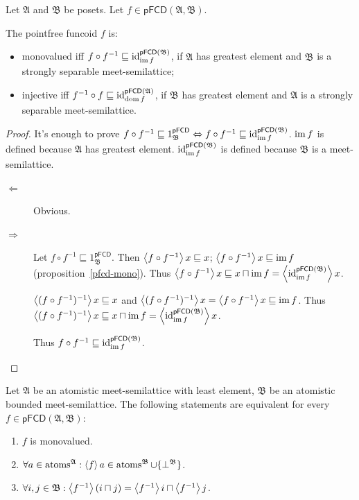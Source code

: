 \begin{prop}
Let $\mathfrak{A}$ and $\mathfrak{B}$ be posets. Let $f\in\mathsf{pFCD}(\mathfrak{A},\mathfrak{B})$.

The pointfree funcoid $f$ is:
\begin{itemize}
\item monovalued iff $f\circ f^{-1}\sqsubseteq{\operatorname{id}}_{\operatorname{im} f}^{\mathsf{pFCD}(\mathfrak{B})}$,
if $\mathfrak{A}$ has greatest element and $\mathfrak{B}$ is a strongly separable meet-semilattice;
\item injective iff $f^{-1}\circ f\sqsubseteq{\operatorname{id}}_{\operatorname{dom} f}^{\mathsf{pFCD}(\mathfrak{A})}$,
if $\mathfrak{B}$ has greatest element and $\mathfrak{A}$ is a strongly separable meet-semilattice. 
\end{itemize}
\end{prop}
\begin{proof}
It's enough to prove $f\circ f^{-1}\sqsubseteq1_{\mathfrak{B}}^{\mathsf{pFCD}}\Leftrightarrow f\circ f^{-1}\sqsubseteq{\operatorname{id}}_{\operatorname{im} f}^{\mathsf{pFCD}(\mathfrak{B})}$.
$\operatorname{im} f$ is defined because $\mathfrak{A}$ has greatest element. ${\operatorname{id}}_{\operatorname{im} f}^{\mathsf{pFCD}(\mathfrak{B})}$ is defined because $\mathfrak{B}$ is a meet-semilattice.
\begin{description}
\item [{$\Leftarrow$}] Obvious.
\item [{$\Rightarrow$}] Let $f\circ f^{-1}\sqsubseteq1_{\mathfrak{B}}^{\mathsf{pFCD}}$.
Then $\left\langle f\circ f^{-1}\right\rangle x\sqsubseteq x$; $\left\langle f\circ f^{-1}\right\rangle x\sqsubseteq\operatorname{im} f$ (proposition~\ref{pfcd-mono}).
Thus $\left\langle f\circ f^{-1}\right\rangle x\sqsubseteq x\sqcap\operatorname{im} f=\left\langle {\operatorname{id}}_{\operatorname{im} f}^{\mathsf{pFCD}(\mathfrak{B})}\right\rangle x$.


$\left\langle (f\circ f^{-1})^{-1}\right\rangle x\sqsubseteq x$ and $\left\langle (f\circ f^{-1})^{-1}\right\rangle x=\left\langle f\circ f^{-1}\right\rangle x\sqsubseteq\operatorname{im} f$.
Thus $\left\langle (f\circ f^{-1})^{-1}\right\rangle x\sqsubseteq x\sqcap\operatorname{im} f=\left\langle {\operatorname{id}}_{\operatorname{im} f}^{\mathsf{pFCD}(\mathfrak{B})}\right\rangle x$.


Thus $f\circ f^{-1}\sqsubseteq{\operatorname{id}}_{\operatorname{im} f}^{\mathsf{pFCD}(\mathfrak{B})}$.

\end{description}
\end{proof}
\begin{thm}
Let $\mathfrak{A}$ be an atomistic meet-semilattice with least element,
$\mathfrak{B}$ be an atomistic bounded meet-semilattice. The following
statements are equivalent for every $f\in\mathsf{pFCD}(\mathfrak{A},\mathfrak{B})$:
\begin{enumerate}
\item \label{pf-thm:func-mono-def}$f$ is monovalued.
\item \label{pf-thm:func-mono-atom}$\forall a\in\operatorname{atoms}^{\mathfrak{A}}:\left\langle f\right\rangle a\in\operatorname{atoms}^{\mathfrak{B}}\cup\{\bot^{\mathfrak{B}}\}$.
\item \label{pf-thm:func-mono-intr-flt}$\forall i,j\in\mathfrak{B}:\left\langle f^{-1}\right\rangle(i\sqcap j)=\left\langle f^{-1}\right\rangle i\sqcap\left\langle f^{-1}\right\rangle j$.
\end{enumerate}
\end{thm}
